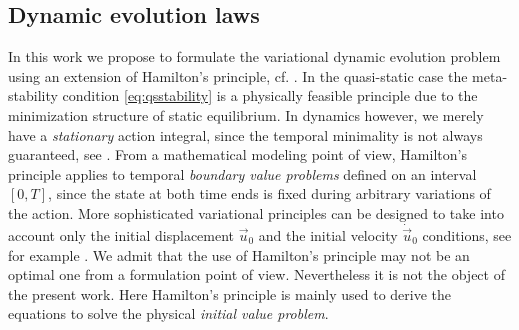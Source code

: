 \subsection{Dynamic evolution laws}
In this work we propose to formulate the variational dynamic evolution problem using an extension of Hamilton's principle, cf. \cite{Hamilton:1834}. In the quasi-static case the meta-stability condition \eqref{eq:qsstability} is a physically feasible principle due to the minimization structure of static equilibrium. In dynamics however, we merely have a \emph{stationary} action integral, since the temporal minimality is not always guaranteed, see \cite{Gray:2007aa}. From a mathematical modeling point of view, Hamilton's principle applies to temporal \emph{boundary value problems} defined on an interval $[0,T]$, since the state at both time ends is fixed during arbitrary variations of the action. More sophisticated variational principles can be designed to take into account only the initial displacement $\vec{u}_0$ and the initial velocity $\dot{\vec{u}}_0$ conditions, see for example \cite{Gurtin:1964aa}. We admit that the use of Hamilton's principle may not be an optimal one from a formulation point of view. Nevertheless it is not the object of the present work. Here Hamilton's principle is mainly used to derive the equations to solve the physical \emph{initial value problem}.

